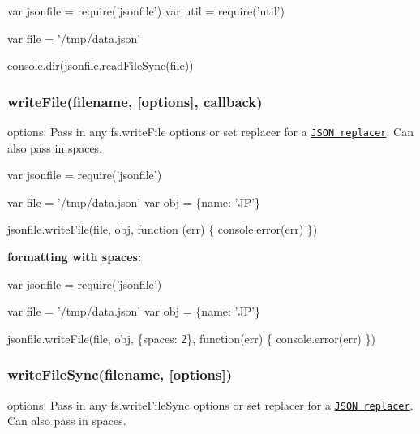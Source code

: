 \begin{DoxyCode}
var jsonfile = require(\textcolor{stringliteral}{'jsonfile'})
var util = require('util')

var file = '/tmp/data.json'

console.dir(jsonfile.readFileSync(file))
\end{DoxyCode}


\subsubsection*{write\+File(filename, \mbox{[}options\mbox{]}, callback)}

{\ttfamily options}\+: Pass in any {\ttfamily fs.\+write\+File} options or set {\ttfamily replacer} for a \href{https://developer.mozilla.org/en-US/docs/Web/JavaScript/Reference/Global_Objects/JSON/stringify}{\tt J\+S\+O\+N replacer}. Can also pass in {\ttfamily spaces}.


\begin{DoxyCode}
var jsonfile = require(\textcolor{stringliteral}{'jsonfile'})

var file = '/tmp/data.json'
var obj = \{name: \textcolor{stringliteral}{'JP'}\}

jsonfile.writeFile(file, obj, \textcolor{keyword}{function} (err) \{
  console.error(err)
\})
\end{DoxyCode}


{\bfseries formatting with spaces\+:}


\begin{DoxyCode}
var jsonfile = require(\textcolor{stringliteral}{'jsonfile'})

var file = '/tmp/data.json'
var obj = \{name: \textcolor{stringliteral}{'JP'}\}

jsonfile.writeFile(file, obj, \{spaces: 2\}, \textcolor{keyword}{function}(err) \{
  console.error(err)
\})
\end{DoxyCode}


\subsubsection*{write\+File\+Sync(filename, \mbox{[}options\mbox{]})}

{\ttfamily options}\+: Pass in any {\ttfamily fs.\+write\+File\+Sync} options or set {\ttfamily replacer} for a \href{https://developer.mozilla.org/en-US/docs/Web/JavaScript/Reference/Global_Objects/JSON/stringify}{\tt J\+S\+O\+N replacer}. Can also pass in {\ttfamily spaces}.


